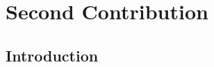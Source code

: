 \chapter{Second Contribution}
\label{chapt:contribtwo}

\begin{intro_block}
\lipsum[1]
\end{intro_block}

\section{Introduction}\label{c4sec:intro}

